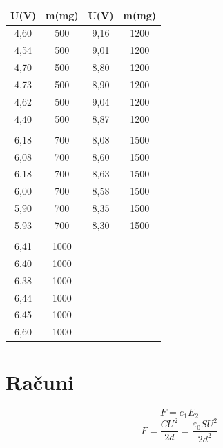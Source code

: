 \documentclass[a4paper]{report}
\begin{document}
    \begin{center}
    \begin{tabular}{|c|c||c|c|}
    \hline
    U(V) & m(mg)&       U(V) & m(mg) \\
    \hline
    4,60 & 500  &       9,16 & 1200 \\
    4,54 & 500  &       9,01 & 1200 \\
    4,70 & 500  &       8,80 & 1200 \\
    4,73 & 500  &       8,90 & 1200 \\
    4,62 & 500  &       9,04 & 1200 \\
    4,40 & 500  &       8,87 & 1200 \\
         &      &            &  \\
    6,18 & 700  &       8,08 & 1500 \\
    6,08 & 700  &       8,60 & 1500 \\
    6,18 & 700  &       8,63 & 1500 \\
    6,00 & 700  &       8,58 & 1500 \\
    5,90 & 700  &       8,35 & 1500 \\
    5,93 & 700  &       8,30 & 1500 \\
         &      &            &  \\
    6,41 & 1000 &        &  \\
    6,40 & 1000 &        &  \\
    6,38 & 1000 &        &  \\
    6,44 & 1000 &        &  \\
    6,45 & 1000 &        &  \\
    6,60 & 1000 &        &  \\
    \hline
    \end{tabular}
    \end{center}

\chapter*{Računi}

\[F = e_1E_2\]
\[F = \frac{CU^{2}}{2d} = \frac{\varepsilon_0 S U^{2}}{2d^{2}}\]
\end{document}
